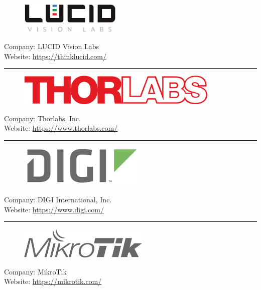 \begin{figure}[h!]
\includegraphics[height=1.5cm]{Pictures/AppLucidLogo}
\end{figure}
\vspace{3mm}
Company: LUCID Vision Labs\\
Website: \url{https://thinklucid.com/}
\vspace{5mm}
\hrule
\vspace{10mm}

\begin{figure}[h!]
\includegraphics[height=1.5cm]{Pictures/AppThorlabsLogo}
\end{figure}
\vspace{3mm}
Company: Thorlabs, Inc.\\
Website: \url{https://www.thorlabs.com/}
\vspace{5mm}
\hrule
\vspace{10mm}

\begin{figure}[h!]
\includegraphics[height=2cm]{Pictures/AppDIGILogo}
\end{figure}
\vspace{3mm}
Company: DIGI International, Inc.\\
Website: \url{https://www.digi.com/}
\vspace{5mm}
\hrule
\vspace{10mm}

\begin{figure}[h!]
\includegraphics[height=1.5cm]{Pictures/AppMikroTikLogo}
\end{figure}
\vspace{3mm}
Company: MikroTik\\
Website: \url{https://mikrotik.com/}
